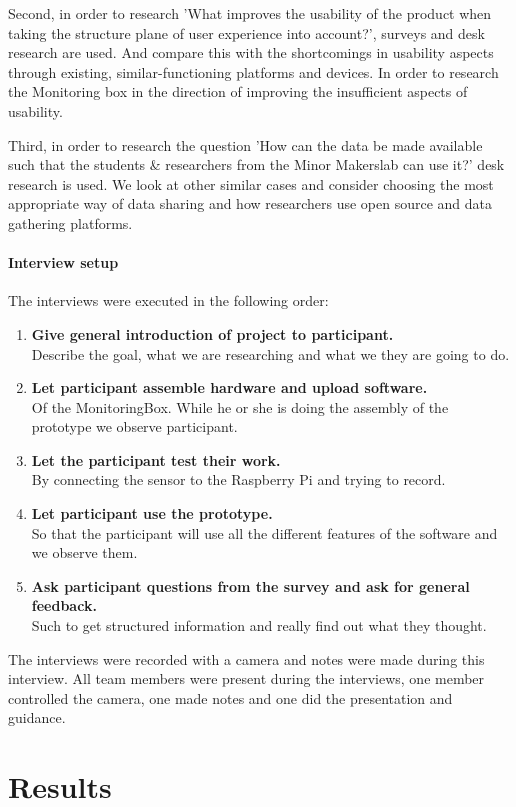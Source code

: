 \documentclass[conference]{IEEEtran}
\begin{document}
			Second, in order to research 'What improves the usability of the product when taking the structure plane of user experience into account?', surveys and desk research are used. And compare this with the shortcomings in usability aspects through existing, similar-functioning platforms and devices. In order to research the Monitoring box in the direction of improving the insufficient aspects of usability.

			Third, in order to research the question 'How can the data be made available such that the students \& researchers from the Minor Makerslab can use it?' desk research is used. We look at other similar cases and consider choosing the most appropriate way of data sharing and how researchers use open source and data gathering platforms.
		\paragraph{Interview setup} The interviews were executed in the following order:
			\begin{enumerate}
				\item \textbf{Give general introduction of project to participant.} \\
				Describe the goal, what we are researching and what we they are going to do.
				\item \textbf{Let participant assemble hardware and upload software.}\\
				Of the MonitoringBox. While he or she is doing the assembly of the prototype we observe participant.
				\item \textbf{Let the participant test their work.}\\
				By connecting the sensor to the Raspberry Pi and trying to record.
				\item \textbf{Let participant use the prototype.}\\
				So that the participant will use all the different features of the software and we observe them.
				\item \textbf{Ask participant questions from the survey and ask for general feedback.}\\
				Such to get structured information and really find out what they thought.
			\end{enumerate}
			The interviews were recorded with a camera and notes were made during this interview. All team members were present during the interviews, one member controlled the camera, one made notes and one did the presentation and guidance.
\section{Results}
\end{document}

